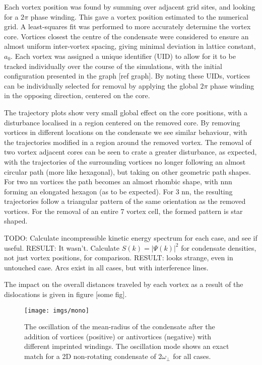 Each vortex position was found by summing over adjacent grid sites, and looking for a $2\pi$ phase winding. This gave a vortex position
estimated to the numerical grid. A least-squares fit was performed to more accurately determine the vortex core. Vortices closest the centre
of the condensate were considered to ensure an almost uniform inter-vortex spacing, giving minimal deviation in lattice constant, $a_0$. Each
vortex was assigned a unique identifier (UID) to allow for it to be tracked individually over the course of the simulations, with the initial
configuration presented in the graph [ref graph]. By noting these UIDs, vortices can be individually selected for removal by applying the
global $2\pi$ phase winding in the opposing direction, centered on the core.

The trajectory plots show very small global effect on the core positions, with a disturbance localised in a region centered on the removed
core. By removing vortices in different locations on the condensate we see similar behaviour, with the trajectories modified in a region
around the removed vortex. The removal of two vortex adjacent cores can be seen to crate a greater disturbance, as expected, with the
trajectories of the surrounding vortices no longer following an almost circular path (more like hexagonal), but taking on other geometric
path shapes. For two nn vortices the path becomes an almost rhombic shape, with nnn forming an elongated hexagon (as to be expected). For 3
nn, the resulting trajectories follow a triangular pattern of the same orientation as the removed vortices. For the removal of an entire 7
vortex cell, the formed pattern is star shaped.

TODO:
Calculate incompressible kinetic energy spectrum for each case, and see if useful. RESULT: It wasn't.
Calculate $S(k) = |\Psi(k)|^2$ for condensate densities, not just vortex positions, for comparison. RESULT: looks strange, even in untouched
case. Arcs exist in all cases, but with interference lines.

The impact on the overall distances traveled by each vortex as a result of the dislocations is given in figure [some fig].

\begin{figure}[tb]
	\texttt{[image: imgs/mono]}
	\caption{The oscillation of the mean-radius of the condensate after the addition of vortices (positive) or antivortices (negative) with
	different imprinted windings. The oscillation mode shows an exact match for a 2D non-rotating condensate of $2\omega_{\perp}$ for all cases.}
\end{figure}


